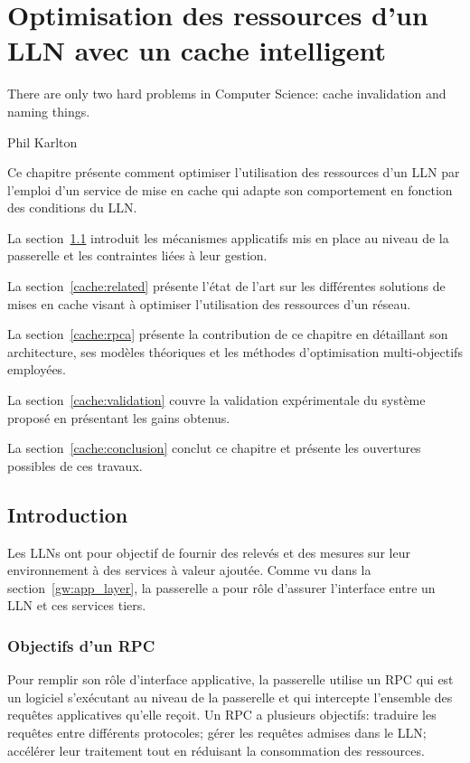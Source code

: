 
\chapter{Optimisation des ressources d'un \ac{LLN} avec un cache intelligent}
\label{cache}

\epigraph{There are only two hard problems in Computer Science: cache invalidation and naming things.}{Phil Karlton}

\minitoc

Ce chapitre présente comment optimiser l'utilisation des ressources d'un \ac{LLN} par l'emploi d'un service de mise en cache qui adapte son comportement en fonction des conditions du \ac{LLN}.

La section~\ref{cache:introduction} introduit les mécanismes applicatifs mis en place au niveau de la passerelle et les contraintes liées à leur gestion.

La section~\ref{cache:related} présente l'état de l'art sur les différentes solutions de mises en cache visant à optimiser l'utilisation des ressources d'un réseau.

La section~\ref{cache:rpca} présente la contribution de ce chapitre en détaillant son architecture, ses modèles théoriques et les méthodes d'optimisation multi-objectifs employées.

La section~\ref{cache:validation} couvre la validation expérimentale du système proposé en présentant les gains obtenus.

La section~\ref{cache:conclusion} conclut ce chapitre et présente les ouvertures possibles de ces travaux.

\section{Introduction}
\label{cache:introduction}

Les \ac{LLN}s ont pour objectif de fournir des relevés et des mesures sur leur environnement à des services à valeur ajoutée.
Comme vu dans la section~\ref{gw:app_layer}, la passerelle a pour rôle d'assurer l'interface entre un \ac{LLN} et ces services tiers.

\subsection{Objectifs d'un \acl{RPC}}

Pour remplir son rôle d'interface applicative, la passerelle utilise un \acf{RPC} qui est un logiciel s'exécutant au niveau de la passerelle et qui intercepte l'ensemble des requêtes applicatives qu'elle reçoit.
Un \ac{RPC} a plusieurs objectifs: traduire les requêtes entre différents protocoles; gérer les requêtes admises dans le \ac{LLN}; accélérer leur traitement tout en réduisant la consommation des ressources.

